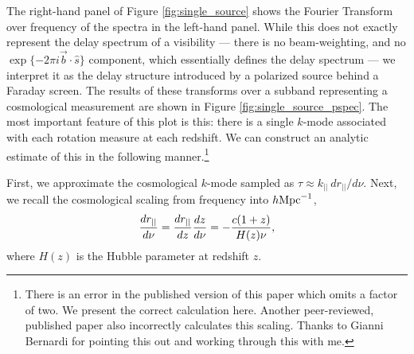 The right-hand panel of Figure \ref{fig:single_source} shows the Fourier Transform over frequency of
the spectra in the left-hand panel. While this does not exactly represent the delay spectrum of a
visibility --- there is no beam-weighting, and no $\exp\{-2\pi i\vec{b}\cdot\hat{s}\}$ component,
which essentially defines the delay spectrum --- we interpret it as the delay structure introduced by
a polarized source behind a Faraday screen. The results of these transforms over a subband
representing a cosmological measurement are shown in Figure \ref{fig:single_source_pspec}. The most
important feature of this plot is this: there is a single $k$-mode associated with each rotation
measure at each redshift. We can construct an analytic estimate of this in the following
manner.\footnote{There is an error in the published version of this paper \cite{Moore2013} which
omits a factor of two. We present the correct calculation here. Another peer-reviewed, published
paper \cite{Pen2009} also incorrectly calculates this scaling. Thanks to Gianni Bernardi for
pointing this out and working through this with me.}

First, we approximate the cosmological $k$-mode sampled as $\tau \approx k_{||}\ dr_{||}/d\nu$.
Next, we recall the cosmological scaling from frequency into $h{\rm Mpc}^{-1}$,
\begin{equation}
  \frac{d r_{||}}{d \nu} = \frac{d r_{||}}{d z}\frac{d z}{d \nu}
    = -\frac{c(1+z)}{H(z)\nu}, 
\end{equation}
where $H(z)$ is the Hubble parameter at redshift $z$.

